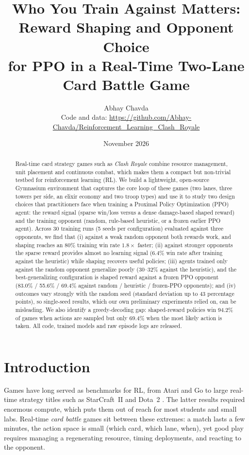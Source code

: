 \documentclass[11pt]{article}
\title{Who You Train Against Matters: Reward Shaping and Opponent Choice\\
for PPO in a Real-Time Two-Lane Card Battle Game}
\author{Abhay Chavda\\
\small Code and data: \url{https://github.com/Abhay-Chavda/Reinforcement_Learning_Clash_Royale}}
\date{November 2026}
\begin{document}
\maketitle

\begin{abstract}
Real-time card strategy games such as \emph{Clash Royale} combine resource
management, unit placement and continuous combat, which makes them a compact
but non-trivial testbed for reinforcement learning (RL). We build a lightweight,
open-source Gymnasium environment that captures the core loop of these games
(two lanes, three towers per side, an elixir economy and two troop types) and
use it to study two design choices that practitioners face when training a
Proximal Policy Optimization (PPO) agent: the reward signal (sparse win/loss
versus a dense damage-based shaped reward) and the training opponent (random,
rule-based heuristic, or a frozen earlier PPO agent). Across 30 training runs
(5 seeds per configuration) evaluated against three opponents, we find that
(i) against a weak random opponent both rewards work, and shaping reaches an
80\% training win rate $1.8\times$ faster; (ii) against stronger opponents the
sparse reward provides almost no learning signal (6.4\% win rate after training
against the heuristic) while shaping recovers useful policies; (iii) agents
trained only against the random opponent generalize poorly (30--32\% against
the heuristic), and the best-generalizing configuration is shaped reward
against a frozen PPO opponent (83.0\% / 55.6\% / 69.4\% against random /
heuristic / frozen-PPO opponents); and (iv) outcomes vary strongly with the
random seed (standard deviation up to 43 percentage points), so single-seed
results, which our own preliminary experiments relied on, can be misleading.
We also identify a greedy-decoding gap: shaped-reward policies win 94.2\% of
games when actions are sampled but only 69.4\% when the most likely action is
taken. All code, trained models and raw episode logs are released.
\end{abstract}

\section{Introduction}

Games have long served as benchmarks for RL, from Atari \citep{mnih2015dqn}
and Go \citep{silver2016alphago} to large real-time strategy titles such as
StarCraft~II \citep{vinyals2019alphastar} and Dota~2 \citep{berner2019dota}.
The latter results required enormous compute, which puts them out of reach for
most students and small labs. Real-time \emph{card battle} games sit between
these extremes: a match lasts a few minutes, the action space is small (which
card, which lane, when), yet good play requires managing a regenerating
resource, timing deployments, and reacting to the opponent.
\end{document}
